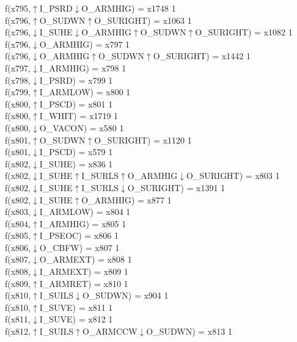 f(x795,$\uparrow$I\_PSRD$\downarrow$O\_ARMHIG) = x1748 {1} \\
f(x796,$\uparrow$O\_SUDWN$\uparrow$O\_SURIGHT) = x1063 {1} \\
f(x796,$\downarrow$I\_SUHE$\downarrow$O\_ARMHIG$\uparrow$O\_SUDWN$\uparrow$O\_SURIGHT) = x1082 {1} \\
f(x796,$\downarrow$O\_ARMHIG) = x797 {1} \\
f(x796,$\downarrow$O\_ARMHIG$\uparrow$O\_SUDWN$\uparrow$O\_SURIGHT) = x1442 {1} \\
f(x797,$\downarrow$I\_ARMHIG) = x798 {1} \\
f(x798,$\downarrow$I\_PSRD) = x799 {1} \\
f(x799,$\uparrow$I\_ARMLOW) = x800 {1} \\
f(x800,$\uparrow$I\_PSCD) = x801 {1} \\
f(x800,$\uparrow$I\_WHIT) = x1719 {1} \\
f(x800,$\downarrow$O\_VACON) = x580 {1} \\
f(x801,$\uparrow$O\_SUDWN$\uparrow$O\_SURIGHT) = x1120 {1} \\
f(x801,$\downarrow$I\_PSCD) = x579 {1} \\
f(x802,$\downarrow$I\_SUHE) = x836 {1} \\
f(x802,$\downarrow$I\_SUHE$\uparrow$I\_SURLS$\uparrow$O\_ARMHIG$\downarrow$O\_SURIGHT) = x803 {1} \\
f(x802,$\downarrow$I\_SUHE$\uparrow$I\_SURLS$\downarrow$O\_SURIGHT) = x1391 {1} \\
f(x802,$\downarrow$I\_SUHE$\uparrow$O\_ARMHIG) = x877 {1} \\
f(x803,$\downarrow$I\_ARMLOW) = x804 {1} \\
f(x804,$\uparrow$I\_ARMHIG) = x805 {1} \\
f(x805,$\uparrow$I\_PSEOC) = x806 {1} \\
f(x806,$\downarrow$O\_CBFW) = x807 {1} \\
f(x807,$\downarrow$O\_ARMEXT) = x808 {1} \\
f(x808,$\downarrow$I\_ARMEXT) = x809 {1} \\
f(x809,$\uparrow$I\_ARMRET) = x810 {1} \\
f(x810,$\uparrow$I\_SUILS$\downarrow$O\_SUDWN) = x904 {1} \\
f(x810,$\uparrow$I\_SUVE) = x811 {1} \\
f(x811,$\downarrow$I\_SUVE) = x812 {1} \\
f(x812,$\uparrow$I\_SUILS$\uparrow$O\_ARMCCW$\downarrow$O\_SUDWN) = x813 {1} \\
